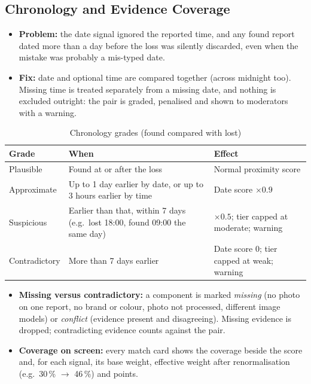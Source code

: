 \documentclass[12pt,a4paper,oneside]{report}
\begin{document}
\subsection{Chronology and Evidence Coverage}\label{sec:chrono}
\begin{itemize}
  \item \textbf{Problem:} the date signal ignored the reported time, and any found report dated more than a day before the loss was silently discarded, even when the mistake was probably a mis-typed date.
  \item \textbf{Fix:} date and optional time are compared together (across midnight too). Missing time is treated separately from a missing date, and nothing is excluded outright: the pair is graded, penalised and shown to moderators with a warning.
\end{itemize}
\begin{table}[H]
\centering\small
\caption{Chronology grades (found compared with lost)}
\begin{tabularx}{\textwidth}{P{24mm}X P{40mm}}
\toprule
Grade & When & Effect\\
\midrule
Plausible & Found at or after the loss & Normal proximity score\\
Approximate & Up to 1 day earlier by date, or up to 3 hours earlier by time & Date score $\times 0.9$\\
Suspicious & Earlier than that, within 7 days (e.g.\ lost 18:00, found 09:00 the same day) & $\times 0.5$; tier capped at moderate; warning\\
Contradictory & More than 7 days earlier & Date score 0; tier capped at weak; warning\\
\bottomrule
\end{tabularx}
\end{table}
\begin{itemize}
  \item \textbf{Missing versus contradictory:} a component is marked \emph{missing} (no photo on one report, no brand or colour, photo not processed, different image models) or \emph{conflict} (evidence present and disagreeing). Missing evidence is dropped; contradicting evidence counts against the pair.
  \item \textbf{Coverage on screen:} every match card shows the coverage beside the score and, for each signal, its base weight, effective weight after renormalisation (e.g.\ 30\,\% $\rightarrow$ 46\,\%) and points.
\end{itemize}
\end{document}
